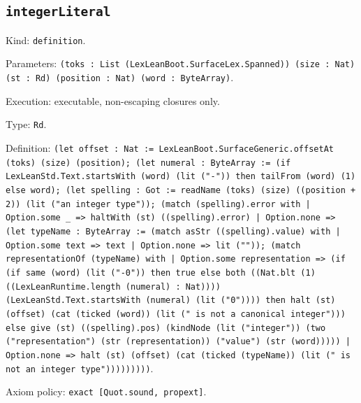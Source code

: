 \documentclass[11pt]{article}
\begin{document}
\subsection*{\texttt{integerLiteral}}
\noindent Kind: \texttt{definition}.\par
\noindent Parameters: \texttt{(toks : List (LexLeanBoot.SurfaceLex.Spanned)) (size : Nat) (st : Rd) (position : Nat) (word : ByteArray)}.\par
\noindent Execution: executable, non-escaping closures only.\par
\noindent Type: \texttt{Rd}.\par
\noindent Definition: \texttt{(let offset : Nat := LexLeanBoot.SurfaceGeneric.offsetAt (toks) (size) (position); (let numeral : ByteArray := (if LexLeanStd.Text.startsWith (word) (lit ("-")) then tailFrom (word) (1) else word); (let spelling : Got := readName (toks) (size) ((position + 2)) (lit ("an integer type")); (match (spelling).error with | Option.some \_ => haltWith (st) ((spelling).error) | Option.none => (let typeName : ByteArray := (match asStr ((spelling).value) with | Option.some text => text | Option.none => lit ("")); (match representationOf (typeName) with | Option.some representation => (if (if same (word) (lit ("-0")) then true else both ((Nat.blt (1) ((LexLeanRuntime.length (numeral) : Nat)))) (LexLeanStd.Text.startsWith (numeral) (lit ("0")))) then halt (st) (offset) (cat (ticked (word)) (lit (" is not a canonical integer"))) else give (st) ((spelling).pos) (kindNode (lit ("integer")) (two ("representation") (str (representation)) ("value") (str (word))))) | Option.none => halt (st) (offset) (cat (ticked (typeName)) (lit (" is not an integer type")))))))))}.\par
\noindent Axiom policy: \texttt{exact [Quot.sound, propext]}.\par
\end{document}
